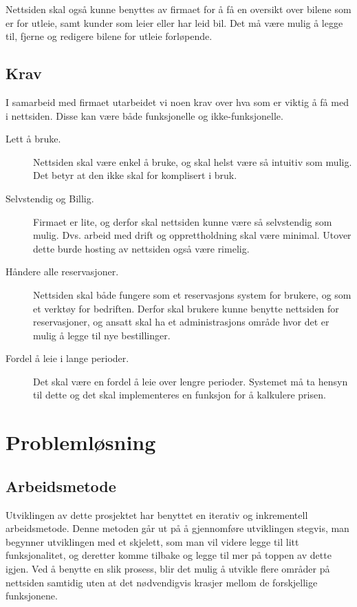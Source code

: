 Nettsiden skal også kunne benyttes av firmaet for å få en oversikt over bilene som er for utleie, samt kunder som leier eller har leid bil. Det må være mulig å legge til, fjerne og redigere bilene for utleie forløpende.


\subsection{Krav}
I samarbeid med firmaet utarbeidet vi noen krav over hva som er viktig å få med i nettsiden. Disse kan være både funksjonelle og ikke-funksjonelle.
\begin{description}
\item[Lett å bruke.]Nettsiden skal være enkel å bruke, og skal helst være så intuitiv som mulig. Det betyr at den ikke skal for komplisert i bruk.
\item[Selvstendig og Billig.]Firmaet er lite, og derfor skal nettsiden kunne være så selvstendig som mulig. Dvs. arbeid med drift og opprettholdning skal være minimal. Utover dette burde hosting av nettsiden også være rimelig.
\item[Håndere alle reservasjoner.]Nettsiden skal både fungere som et reservasjons system for brukere, og som et verktøy for bedriften. Derfor skal brukere kunne benytte nettsiden for reservasjoner, og ansatt skal ha et administrasjons område hvor det er mulig å legge til nye bestillinger.
\item[Fordel å leie i lange perioder.]Det skal være en fordel å leie over lengre perioder. Systemet må ta hensyn til dette og det skal implementeres en funksjon for å kalkulere prisen.
\end{description}



\section{Problemløsning}
\subsection{Arbeidsmetode}
Utviklingen av dette prosjektet har benyttet en iterativ og inkrementell arbeidsmetode. Denne metoden går ut på å gjennomføre utviklingen stegvis, man begynner utviklingen med et skjelett, som man vil videre legge til litt funksjonalitet, og deretter komme tilbake og legge til mer på toppen av dette igjen. Ved å benytte en slik prosess, blir det mulig å utvikle flere områder på nettsiden samtidig uten at det nødvendigvis krasjer mellom de forskjellige funksjonene.

